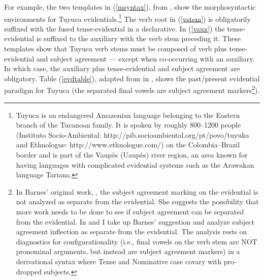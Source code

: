 \documentclass{article}
\begin{document}
For example, the two templates in (\ref{msyntax}), from , show the morphosyntactic environments for Tuyuca evidentials.\footnote{Tuyuca is an endangered Amazonian language belonging to the Eastern branch of the Tucanoan family. It is spoken by roughly 800--1200 people (Instituto Socio-Ambiental: http://pib.socioambiental.org/pt/povo/tuyuka and Ethnologue: http://www.ethnologue.com/) on the Colombia--Brazil border and is part of the Vaup\`es (Uaup\`es) river region, an area known for having languages with complicated evidential systems such as the Arawakan language Tariana.} The verb root in (\ref{vstem}) is obligatorily suffixed with the fused tense-evidential in a declarative. In (\ref{vaux}) the tense-evidential is suffixed to the auxiliary with the verb stem preceding it. These templates show that Tuyuca verb stems must be composed of verb plus tense-evidential and subject agreement --- except when co-occurring with an auxiliary. In which case, the auxiliary plus tense-evidential and subject agreement are obligatory. Table (\ref{evdtable}), adapted from \cite{barnes84evd} in , shows the past/present evidential paradigm for Tuyuca (the separated final vowels are subject agreement markers\footnote{In Barnes' original work, , the subject agreement marking on the evidential is not analyzed as separate from the evidential. She suggests the possibility that more work needs to be done to see if subject agreement can be separated from the evidential. In \cite{bowles08thesis} and \cite{bowles08fusedte} I take up Barnes' suggestion and analyze subject agreement inflection as separate from the evidential. The analysis rests on diagnostics for configurationality (i.e., final vowels on the verb stem are NOT pronominal arguments, but instead are subject agreement markers) in a derivational syntax where Tense and Nominative case covary with pro-dropped subjects.}\label{agrfootnote}).  


\begin{exe}
\ex \label{msyntax}
\begin{xlist}
\label{vstem}
\label{vaux}
\end{xlist}
\end{exe}
 
\end{document}
